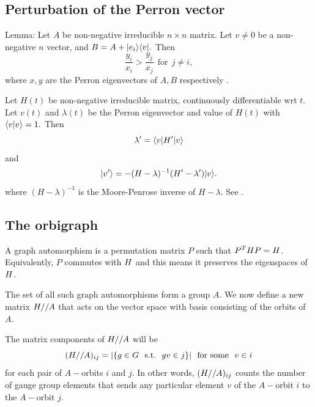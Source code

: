 %

\subsection{Perturbation of the Perron vector}

Lemma:
Let $A$ be non-negative irreducible $n\times n$ matrix.
Let $v\ne 0$ be a non-negative $n$ vector, and $B = A + |{e_i}\rangle\langle{v}|.$
Then 
$$
\frac{y_i}{x_i} > \frac{y_j}{x_j} \ \ \mbox{for}\ \ j \ne i,
$$
where $x, y$ are the Perron eigenvectors of $A, B$ respectively
\cite{Elsner1982}.

Let $H(t)$ be non-negative irreducible matrix, continuously
differentiable wrt $t.$
Let $v(t)$ and $\lambda(t)$ be the Perron eigenvector and value of $H(t)$
with $\langle{v}|{v}\rangle=1.$
Then
$$
    \lambda' = \langle{v}|H'|{v}\rangle
$$
and
$$
    |{v'}\rangle = -(H-\lambda)^{-1}(H' - \lambda')|{v}\rangle.
$$
where $(H-\lambda)^{-1}$ is the Moore-Penrose inverse of $H-\lambda.$ See \cite{Meyer1988}.


%

\subsection{The orbigraph}

A graph automorphism is a permutation matrix $P$
such that $P^T H P = H$.
Equivalently, $P$ commutes with $H$ and this means it preserves
the eigenspaces of $H$.

\def\auto{A}
The set of all such graph automorphisms 
form a group $\auto$.
We now define a new matrix $\Ham//\auto$
that acts on the vector space with basis consisting
of the orbits of $\auto.$

The matrix components of $\Ham//\auto$ will be
$$
    (\Ham//\auto)_{ij} = |\{ g\in G \smbox{s.t.} gv \in j \}| \smbox{for some}v\in i
$$
for each pair of $\auto-$orbits $i$ and $j$.
In other words, 
$(\Ham//\auto)_{ij} $ counts the number of gauge group
elements that sends any particular element $v$ of the 
$\auto-$orbit $i$ to the $\auto-$orbit $j.$

